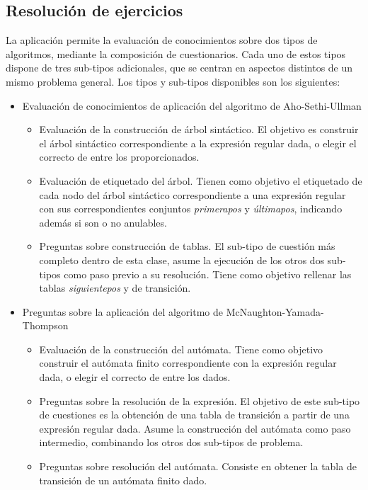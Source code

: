 \subsection{Resolución de ejercicios}
La aplicación permite la evaluación de conocimientos sobre dos tipos de algoritmos, mediante la composición de cuestionarios.
Cada uno de estos tipos dispone de tres sub-tipos adicionales, que se centran en aspectos distintos de un mismo problema general.
Los tipos y sub-tipos disponibles son los siguientes:
\begin{itemize}
	\item Evaluación de conocimientos de aplicación del algoritmo de Aho-Sethi-Ullman
	\begin{itemize}
		\item Evaluación de la construcción de árbol sintáctico.
		El objetivo es construir el árbol sintáctico correspondiente a la expresión regular dada, o elegir el correcto de entre los proporcionados.
		\item Evaluación de etiquetado del árbol.
		Tienen como objetivo el etiquetado de cada nodo del árbol sintáctico correspondiente a una expresión regular con sus correspondientes conjuntos \emph{primerapos} y \emph{últimapos}, indicando además si son o no anulables.
		\item Preguntas sobre construcción de tablas.
		El sub-tipo de cuestión más completo dentro de esta clase, asume la ejecución de los otros dos sub-tipos como paso previo a su resolución.
		Tiene como objetivo rellenar las tablas \emph{siguientepos} y de transición.
	\end{itemize}
	\item Preguntas sobre la aplicación del algoritmo de McNaughton-Yamada-Thompson
	\begin{itemize}
		\item Evaluación de la construcción del autómata.
		Tiene como objetivo construir el autómata finito correspondiente con la expresión regular dada, o elegir el correcto de entre los dados.
		\item Preguntas sobre la resolución de la expresión.
		El objetivo de este sub-tipo de cuestiones es la obtención de una tabla de transición a partir de una expresión regular dada.
		Asume la construcción del autómata como paso intermedio, combinando los otros dos sub-tipos de problema.
		\item Preguntas sobre resolución del autómata.
		Consiste en obtener la tabla de transición de un autómata finito dado.
	\end{itemize}
\end{itemize}

